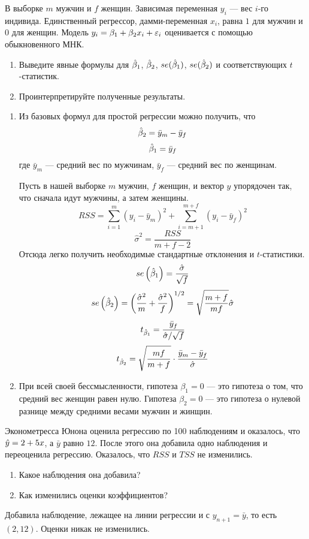 \begin{problem}
В выборке $m$ мужчин и $f$ женщин. Зависимая переменная $y_i$ — вес $i$-го индивида. Единственный регрессор, 
дамми-переменная $x_i$, равна $1$ для мужчин и $0$ для женщин. Модель $y_i=\beta_1 + \beta_2 x_i +\varepsilon_i$ 
оценивается с помощью обыкновенного МНК.
\begin{enumerate}
\item Выведите явные формулы для $\hat{\beta}_1$, $\hat{\beta}_2$, $se(\hat{\beta}_1)$, $se(\hat{\beta}_2)$ и соответствующих $t$-статистик.
\item Проинтерпретируйте полученные результаты.
\end{enumerate}


\begin{sol}
\begin{enumerate}
\item Из базовых формул для простой регрессии можно получить, что
\[\hat{\beta}_2 = \bar{y}_m - \bar{y}_f \]
\[\hat{\beta}_1 = \bar{y}_f  \]
где \(\bar{y}_m\) — средний вес по мужчинам, \(\bar{y}_f\) — средний вес по женщинам.

Пусть в нашей выборке \(m\) мужчин, \(f\) женщин, и вектор \(y\) упорядочен так, что сначала идут мужчины, а затем женщины.
\[RSS = \sum_{i = 1}^m (y_i - \bar{y}_m)^2 + \sum_{i = m+1}^{m+f} (y_i - \bar{y}_f)^2 \]
\[\hat{\sigma}^2 = \frac{RSS}{m + f - 2}  \]
Отсюда легко получить необходимые стандартные отклонения и \(t\)-статистики.
\[se\left(\hat{\beta}_1 \right) = \frac{\hat{\sigma}}{\sqrt{f}} \]
\[se\left(\hat{\beta}_2 \right) = \left(\frac{\hat{\sigma}^2}{m} + \frac{\hat{\sigma}^2}{f} \right)^{1/2}= \sqrt{\frac{m+f}{mf}} \hat{\sigma} \]
\[t_{\hat{\beta}_1} = \frac{\bar{y}_f}{\hat{\sigma}/\sqrt{f}}\]
\[t_{\hat{\beta}_2} = \sqrt{\frac{mf}{m+f}} \cdot\frac{\bar{y}_m - \bar{y}_f}{\hat{\sigma}}\]
\item При всей своей бессмысленности, гипотеза \(\beta_1 = 0\) — это гипотеза о том, что средний вес женщин равен нулю. Гипотеза \(\beta_2 = 0\) — это гипотеза о нулевой разнице между средними весами мужчин и жинщин.
\end{enumerate}

\end{sol}
\end{problem}


\begin{problem}
Эконометресса Юнона оценила регрессию по 100 наблюдениям и оказалось, что $\hat{y}=2+5x$, а $\bar{y}$ равно $12$. После этого она добавила одно наблюдения и переоценила регрессию. Оказалось, что $RSS$ и $TSS$ не изменились.
\begin{enumerate}
\item Какое наблюдения она добавила?
\item Как изменились оценки коэффициентов?
\end{enumerate}



\begin{sol}
Добавила наблюдение, лежащее на линии регрессии и с $y_{n+1}=\bar{y}$, то есть $(2,12)$. Оценки никак не изменились.
\end{sol}
\end{problem}




